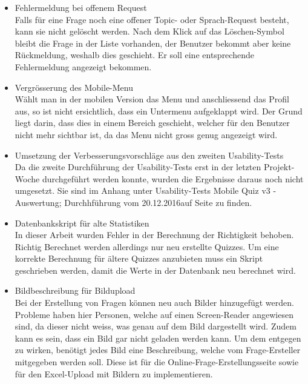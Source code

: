 \begin{itemize}
	\item Fehlermeldung bei offenem Request\\
	Falls für eine Frage noch eine offener Topic- oder Sprach-Request besteht, kann sie nicht gelöscht werden. Nach dem Klick auf das Löschen-Symbol bleibt die Frage in der Liste vorhanden, der Benutzer bekommt aber keine Rückmeldung, weshalb dies geschieht. Er soll eine entsprechende Fehlermeldung angezeigt bekommen.
	
	\item Vergrösserung des Mobile-Menu\\
	Wählt man in der mobilen Version das Menu und anschliessend das Profil aus, so ist nicht ersichtlich, dass ein Untermenu aufgeklappt wird. Der Grund liegt darin, dass dies in einem Bereich geschieht, welcher für den Benutzer nicht mehr sichtbar ist, da das Menu nicht gross genug angezeigt wird.
	
	\item Umsetzung der Verbesserungsvorschläge aus den zweiten Usability-Tests\\
	Da die zweite Durchführung der Usability-Tests erst in der letzten Projekt-Woche durchgeführt werden konnte, wurden die Ergebnisse daraus noch nicht umgesetzt. Sie sind im Anhang unter \glqq Usability-Tests Mobile Quiz v3 - Auswertung; Durchhführung vom 20.12.2016\grqq auf Seite \hyperlink{page.\getpagerefnumber{pdf:UTAW2}}{} zu finden.
	
	\item Datenbankskript für alte Statistiken\\
	In dieser Arbeit wurden Fehler in der Berechnung der Richtigkeit behoben. Richtig Berechnet werden allerdings nur neu erstellte Quizzes. Um eine korrekte Berechnung für ältere Quizzes anzubieten muss ein Skript geschrieben werden, damit die Werte in der Datenbank neu berechnet wird.
	
	\item Bildbeschreibung für Bildupload \\
	Bei der Erstellung von Fragen können neu auch Bilder hinzugefügt werden. Probleme haben hier Personen, welche auf einen Screen-Reader angewiesen sind, da dieser nicht weiss, was genau auf dem Bild dargestellt wird. Zudem kann es sein, dass ein Bild gar nicht geladen werden kann. Um dem entgegen zu wirken, benötigt jedes Bild eine Beschreibung, welche vom Frage-Ersteller mitgegeben werden soll. Diese ist für die Online-Frage-Erstellungsseite sowie für den Excel-Upload mit Bildern zu implementieren.
\end{itemize}





